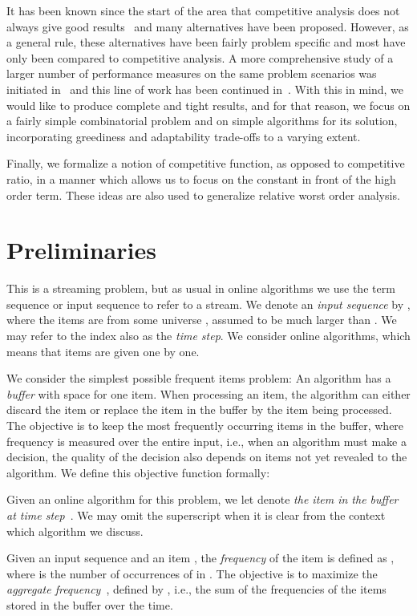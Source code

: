 \documentclass[11pt]{article}
\begin{document}
It has been known since the start of the area that competitive analysis does not
always give good results~\cite{ST85} and many alternatives have been proposed.
However, as a general rule, these alternatives have been fairly problem specific
and most have only been compared to competitive analysis.
A more comprehensive study of a larger number of performance measures
on the same problem scenarios was initiated in~\cite{BIL09p}
and this line of work has been continued in~\cite{BLM12p,BGL12p,BGLtap}.
With this in mind, we would like to produce complete and tight results,
and for that reason, we focus on a fairly simple combinatorial problem
and on simple algorithms for its solution, incorporating greediness
and adaptability trade-offs to a varying extent.

Finally, we formalize a notion of competitive function, as opposed to
competitive ratio, in a manner which allows us to focus on the constant
in front of the high order term.
These ideas are also used to generalize
relative worst order analysis.

\section{Preliminaries}\label{sec:prob}
This is a streaming problem, but as usual in online algorithms
we use the term sequence or input sequence to refer to
a stream.
We denote an \emph{input sequence} by ,
where the items  are from some universe ,
assumed to be much larger than .
We may refer to the index also as the \emph{time step}.
We consider online algorithms, which means that items are given
one by one. 


We consider the simplest possible frequent items
problem: An algorithm has a \emph{buffer} with space for one item.
When processing an item, the algorithm can either discard the item
or replace the item in the buffer by the item being processed.
The objective is to keep the most frequently occurring items in the buffer,
where frequency is measured over the entire input, i.e.,
when an algorithm must make a decision, the quality of the decision
also depends on items not yet revealed to the algorithm.
We define this objective function formally:

Given an online algorithm  for this problem,
we let  denote \emph{the item in the buffer at time step~}.
We may omit the superscript when it is clear from the context which
algorithm we discuss.

Given an input sequence  and an item , the {\em frequency}
of the item is defined as ,
where  is the number of occurrences of  in .
The objective is to maximize the
\emph{aggregate frequency}~\cite{Giannakopoulos12}, defined by
,
i.e., the sum of the frequencies of the items stored in the
buffer over the time.
\end{document}

